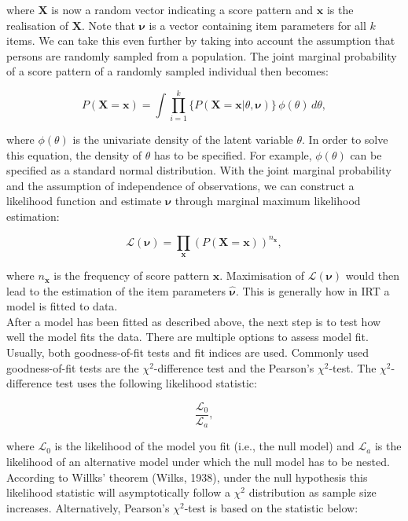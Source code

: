 \documentclass[Royal,sageapa,times,doublespace]{sagej}
\begin{document}
where $\boldsymbol{X}$ is now a random vector indicating a score pattern and $\boldsymbol{x}$ is the realisation of $\boldsymbol{X}$. Note that $\boldsymbol{\nu}$ is a vector containing item parameters for all $k$ items. We can take this even further by taking into account the assumption that persons are randomly sampled from a population. The joint marginal probability of a score pattern of a randomly sampled individual then becomes:

\begin{equation}
P(\boldsymbol{X} = \boldsymbol{x}) = \int \prod_{i=1}^{k} \{ P(\boldsymbol{X} = \boldsymbol{x} | \theta, \boldsymbol{\nu}) \} \,\phi(\theta)\,d\theta,
\end{equation}

where $\phi(\theta)$ is the univariate density of the latent variable $\theta$. In order to solve this equation, the density of $\theta$ has to be specified. For example, $\phi(\theta)$ can be specified as a standard normal distribution. With the joint marginal probability and the assumption of independence of observations, we can construct a likelihood function and estimate $\boldsymbol{\nu}$ through marginal maximum likelihood estimation:

\begin{equation}
\mathcal{L}(\boldsymbol{\nu}) = \prod_{\boldsymbol{x}} (P(\boldsymbol{X} = \boldsymbol{x}))^{n_{\boldsymbol{x}}},
\end{equation}

where $n_{\boldsymbol{x}}$ is the frequency of score pattern $\boldsymbol{x}$. Maximisation of $\mathcal{L}(\boldsymbol{\nu})$ would then lead to the estimation of the item parameters $\boldsymbol{\hat{\nu}}$. This is generally how in IRT a model is fitted to data. \\
\indent After a model has been fitted as described above, the next step is to test how well the model fits the data. There are multiple options to assess model fit. Usually, both goodness-of-fit tests and fit indices are used. Commonly used goodness-of-fit tests are the $\chi^2$-difference test and the Pearson's $\chi^2$-test. The $\chi^2$-difference test uses the following likelihood statistic:

\begin{equation}
\frac{\mathcal{L}_0}{\mathcal{L}_a},
\end{equation}

where $\mathcal{L}_0$ is the likelihood of the model you fit (i.e., the null model) and $\mathcal{L}_a$ is the likelihood of an alternative model under which the null model has to be nested. According to Willks' theorem (Wilks, 1938), under the null hypothesis this likelihood statistic will asymptotically follow a $\chi^2$ distribution as sample size increases. Alternatively, Pearson's $\chi^2$-test is based on the statistic below: 
\end{document}
